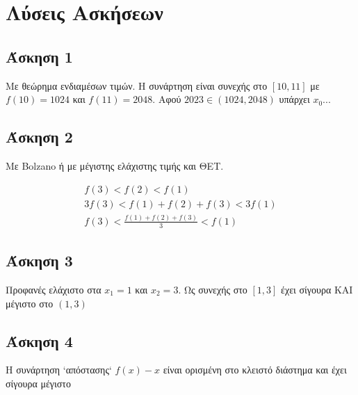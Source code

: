 \documentclass[greek]{beamer}
\begin{document}
\appendix
\section{Λύσεις Ασκήσεων}
\begin{frame}
 \tableofcontents
\end{frame}

\subsection{Άσκηση 1}
\begin{frame}[label=Λύση1]
 Με θεώρημα ενδιαμέσων τιμών. Η συνάρτηση είναι συνεχής στο $[10,11]$ με $f(10)=1024$ και $f(11)=2048$. Αφού $2023\in (1024,2048)$ υπάρχει $x_0$...

 \hyperlink{Άσκηση1}{}
\end{frame}

\subsection{Άσκηση 2}
\begin{frame}[label=Λύση2]
 Με Bolzano ή με μέγιστης ελάχιστης τιμής και ΘΕΤ.

 \begin{gather*}
  f(3)<f(2)<f(1) \\
  3f(3)<f(1)+f(2)+f(3)<3f(1) \\
  f(3)<\frac{f(1)+f(2)+f(3)}{3}<f(1)
 \end{gather*}

 \hyperlink{Άσκηση2}{}
\end{frame}

\subsection{Άσκηση 3}
\begin{frame}[label=Λύση3]
 Προφανές ελάχιστο στα $x_1=1$ και $x_2=3$. Ως συνεχής στο $[1,3]$ έχει σίγουρα ΚΑΙ μέγιστο στο $(1,3)$

 \hyperlink{Άσκηση3}{}
\end{frame}

\subsection{Άσκηση 4}
\begin{frame}[label=Λύση4]
 Η συνάρτηση `απόστασης` $f(x)-x$ είναι ορισμένη στο κλειστό διάστημα και έχει σίγουρα μέγιστο

 \hyperlink{Άσκηση4}{}
\end{frame}
\end{document}
